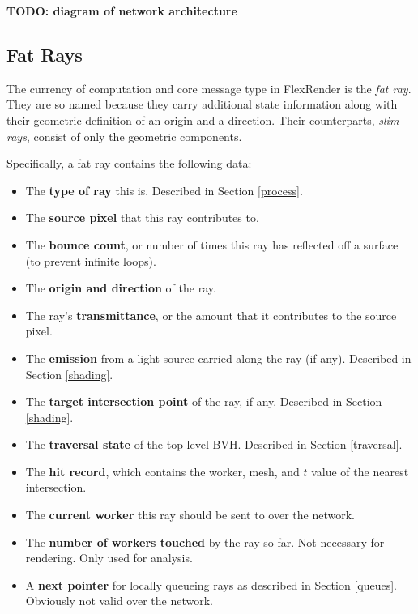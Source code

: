 \documentclass[12pt]{ucthesis}
\begin{document}
\textbf{TODO: diagram of network architecture}

\subsection{Fat Rays}
\label{fatrays}

The currency of computation and core message type in FlexRender is the
\emph{fat ray}. They are so named because they carry additional state
information along with their geometric definition of an origin and a direction.
Their counterparts, \emph{slim rays}, consist of only the geometric components.

Specifically, a fat ray contains the following data:

\begin{itemize}
    \item The \textbf{type of ray} this is. Described in Section \ref{process}.
    \item The \textbf{source pixel} that this ray contributes to.
    \item The \textbf{bounce count}, or number of times this ray has reflected
        off a surface (to prevent infinite loops).
    \item The \textbf{origin and direction} of the ray.
    \item The ray's \textbf{transmittance}, or the amount that it contributes
        to the source pixel.
    \item The \textbf{emission} from a light source carried along the ray (if
        any). Described in Section \ref{shading}.
    \item The \textbf{target intersection point} of the ray, if any. Described
        in Section \ref{shading}.
    \item The \textbf{traversal state} of the top-level BVH. Described in
        Section \ref{traversal}.
    \item The \textbf{hit record}, which contains the worker, mesh, and $t$
        value of the nearest intersection.
    \item The \textbf{current worker} this ray should be sent to over the
        network.
    \item The \textbf{number of workers touched} by the ray so far. Not
        necessary for rendering. Only used for analysis.
    \item A \textbf{next pointer} for locally queueing rays as described in
        Section \ref{queues}. Obviously not valid over the network.
\end{itemize}
\end{document}
